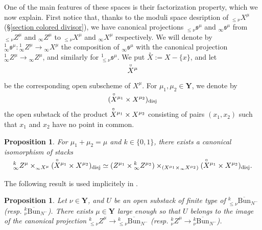 \documentclass[11pt]{amsart}
\theoremstyle{plain}
\newtheorem{prop}[thm]{Proposition}
\theoremstyle{remark}
\numberwithin{equation}{section}
\begin{document}
	One of the main features of these spaces is their factorization property, which we now explain.  First notice that, thanks to the moduli space desription of ${_{\leq\nu} X^\mu}$ (§\ref{section colored divisor}), we have canonical projections $_{\leq\nu}\mathfrak{s}^\mu$ and $_{\infty}\mathfrak{s}^\mu$ from $_{\leq\nu} Z^\mu$ and $_{\infty} Z^\mu$ to ${_{\leq\nu} X^\mu}$ and ${_{\infty} X^\mu}$ respectively. We will denote by $_{\infty}^1\mathfrak{s}^\mu:{_{\infty}^1 Z^\mu}\to {_{\infty} X^\mu}$ the composition of $_{\infty}\mathfrak{s}^\mu$ with the canonical projection $_{\infty}^1 Z^\mu\to {_{\infty} Z^\mu}$, and similarly for $_{\leq\nu}^1\mathfrak{s}^\mu$. We put $\overset{\circ}{X}:=X-\{x\}$, and let 
 $$\smash[t]{\overset{\circ}{X}}^\mu$$ 
 be the corresponding open subscheme of $X^\mu$. For $\mu_1,\mu_2\in \mathbf{Y}$, we denote by $$(\smash[t]{\overset{\circ}{X}}^{\mu_1}\times X^{\mu_2})_{\mathrm{disj}}$$ the open substack of the product $\smash[t]{\overset{\circ}{X}}^{\mu_1}\times X^{\mu_2}$ consisting of pairs $(x_1,x_2)$ such that $x_1$ and $x_2$ have no point in common. 
	\begin{prop}{{\cite[Lemma 4.1.5]{BBGM}}}\label{prop factorization zastava}
		For  $\mu_1+\mu_2=\mu$ and $k\in\{0,1\}$, there exists a canonical isomorphism of stacks
		\begin{equation}\label{facto}
			^k_\infty Z^\mu\times_{_\infty X^\mu}(\smash[t]{\overset{\circ}{X}}^{\mu_1}\times X^{\mu_2})_{\mathrm{disj}}\simeq (Z^{\mu_1}\times {^k_\infty Z^{\mu_2}})\times_{(X^{\mu_1}\times{_\infty X^{\mu_2}})}(\smash[t]{\overset{\circ}{X}}^{\mu_1}\times X^{\mu_2})_{\mathrm{disj}}.
		\end{equation}
	\end{prop}
	The following result is used implicitely in \cite{ABBGM}. 
	\begin{prop}{{\cite[§3.6]{BBGM}}}\label{zastava prop}
		Let $\nu\in\mathbf{Y}$, and $U$ be an open substack of finite type of ${^k_{\leq\nu}\overline{\mathrm{Bun}}_{N^-}}$ (resp. ${^k_\nu\overline{\mathrm{Bun}}_{N^-}}$). There exists $\mu\in\mathbf{Y}$ large enough so that $U$ belongs to the image of the canonical projection ${_{\leq\nu} ^kZ}^\mu\to {_{\leq\nu}^k\overline{\mathrm{Bun}}_{N^-}}$ (resp. ${_\nu ^kZ}^\mu\to {_\nu^k\overline{\mathrm{Bun}}_{N^-}}$).
	\end{prop}
	
	
	
\end{document}
